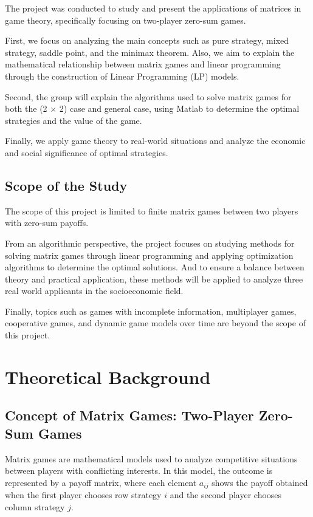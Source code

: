 \documentclass[12pt,a4paper]{article}
\begin{document}
The project was conducted to study and present the applications of matrices in game theory, specifically focusing on two-player zero-sum games. 

First, we focus on analyzing the main concepts such as pure strategy, mixed strategy, saddle point, and the minimax theorem. Also, we aim to explain the mathematical relationship between matrix games and linear programming through the construction of Linear Programming (LP) models. 

Second, the group will explain the algorithms used to solve matrix games for both the (2 × 2) case and general case, using Matlab to determine the optimal strategies and the value of the game. 

Finally, we apply game theory to real-world situations and analyze the economic and social significance of optimal strategies.


\subsection{Scope of the Study}

The scope of this project is limited to finite matrix games between two players with zero-sum payoffs.  

From an algorithmic perspective, the project focuses on studying methods for solving matrix games through linear programming and applying optimization algorithms to determine the optimal solutions. And to ensure a balance between theory and practical application, these methods will be applied to analyze three real world applicants in the socioeconomic field.

Finally, topics such as games with incomplete information, multiplayer games, cooperative games, and dynamic game models over time are beyond the scope of this project.



\section{Theoretical Background}
\subsection{Concept of Matrix Games: Two-Player Zero-Sum Games}

Matrix games are mathematical models used to analyze competitive situations between players with conflicting interests. In this model, the outcome is represented by a payoff matrix, where each element \(a_{ij}\) shows the payoff obtained when the first player chooses row strategy \(i\) and the second player chooses column strategy \(j\).
\end{document}
